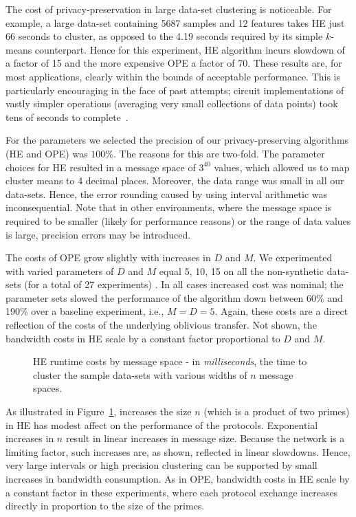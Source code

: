 The cost of privacy-preservation in large data-set clustering is
noticeable.  For example, a large data-set containing 5687 samples and
12 features takes HE just 66 seconds to cluster, as opposed to the
4.19 seconds required by its simple $k$-means counterpart.  Hence for
this experiment, HE algorithm incurs slowdown of a factor of 15 and the
more expensive OPE a factor of 70.  These results are, for most
applications, clearly within the bounds of acceptable performance.
This is particularly encouraging in the face of past attempts; circuit
implementations of vastly simpler operations (averaging very small
collections of data points) took tens of seconds to
complete~\cite{mnps04}.


For the parameters we selected the precision of our privacy-preserving
algorithms (HE and OPE) was $100\%$.  The reasons for this are
two-fold.  The parameter choices for HE resulted in a message space
of $3^{40}$ values, which allowed us to map cluster means to 4 decimal
places.  Moreover, the data range was small in all our data-sets.
Hence, the error rounding caused by using interval arithmetic was
inconsequential.  Note that in other environments, where the message
space is required to be smaller (likely for performance reasons) or
the range of data values is large, precision errors may be introduced.

The costs of OPE grow slightly with increases in $D$ and $M$.  We
experimented with varied parameters of $D$ and $M$ equal 5, 10, 15 on
all the non-synthetic data-sets (for a total of 27 experiments) .  In
all cases increased cost was nominal; the parameter sets slowed the
performance of the algorithm down between 60\% and 190\% over a
baseline experiment, i.e., $M=D=5$.  Again, these costs are a direct
reflection of the costs of the underlying oblivious transfer.  Not
shown, the bandwidth costs in HE scale by a constant factor
proportional to $D$ and $M$.

\begin{figure}
\begin{center}
\caption{HE runtime costs by message space - in {\it
milliseconds}, the time to cluster the sample data-sets with various
widths of $n$ message spaces.}
\label{fig:dpe-param}
\end{center}
\end{figure}

As illustrated in Figure~\ref{fig:dpe-param}, increases the size $n$
(which is a product of two primes) in HE has modest affect on the
performance of the protocols.  Exponential increases in $n$ result in
linear increases in message size.  Because the network is a limiting
factor, such increases are, as shown, reflected in linear slowdowns.
Hence, very large intervals or high precision clustering can be
supported by small increases in bandwidth consumption.  As in OPE,
bandwidth costs in HE scale by a constant factor in these
experiments, where each protocol exchange increases directly in
proportion to the size of the primes.

